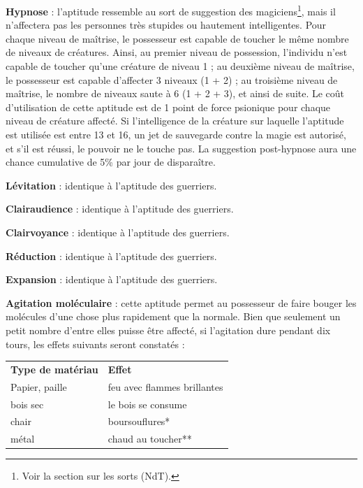 \documentclass[11pt]{article}
\begin{document}
{\bigskip

\textbf{Hypnose} : l'aptitude ressemble au sort de suggestion des magiciens\footnote{Voir la section sur les sorts (NdT).}, mais il n'affectera pas les personnes très stupides ou hautement intelligentes. Pour chaque niveau de maîtrise, le possesseur est capable de toucher le même nombre de niveaux de créatures. Ainsi, au premier niveau de possession, l'individu n'est capable de toucher qu'une créature de niveau 1 ; au deuxième niveau de maîtrise, le possesseur est capable d'affecter 3 niveaux (1 + 2) ; au troisième niveau de maîtrise, le nombre de niveaux saute à 6 (1 + 2 + 3), et ainsi de suite. Le coût d'utilisation de cette aptitude est de 1 point de force psionique pour chaque niveau de créature affecté. Si l'intelligence de la créature sur laquelle l'aptitude est utilisée est entre 13 et 16, un jet de sauvegarde contre la magie est autorisé, et s'il est réussi, le pouvoir ne le touche pas. La suggestion post-hypnose aura une chance cumulative de 5\% par jour de disparaître.

\bigskip

\textbf{Lévitation} : identique à l'aptitude des guerriers.

\bigskip

\textbf{Clairaudience} : identique à l'aptitude des guerriers.

\bigskip

\textbf{Clairvoyance} : identique à l'aptitude des guerriers.

\bigskip

\textbf{Réduction} : identique à l'aptitude des guerriers.

\bigskip

\textbf{Expansion} : identique à l'aptitude des guerriers.

\bigskip

\textbf{Agitation moléculaire} : cette aptitude permet au possesseur de faire bouger les molécules d'une chose plus rapidement que la normale. Bien que seulement un petit nombre d'entre elles puisse être affecté, si l'agitation dure pendant dix tours, les effets suivants seront constatés :

\medskip

\begin{tabular}{p{8cm}p{8cm}}
\textbf{Type de matériau} & \textbf{Effet} \\
Papier, paille & feu avec flammes brillantes \\
bois sec & le bois se consume \\
chair & boursouflures* \\
métal & chaud au toucher** \\
\end{tabular}

}
\end{document}
